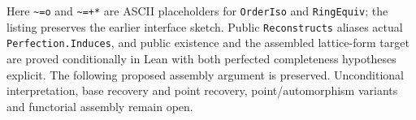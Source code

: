 \documentclass[11pt,oneside]{article}
\theoremstyle{definition}
\theoremstyle{remark}
\newcommand{\lean}[1]{\nolinkurl{#1}}
\begin{document}
Here \lean{~=o} and \lean{~=+*} are ASCII placeholders for \lean{OrderIso} and
\lean{RingEquiv}; the listing preserves the earlier interface sketch. Public
\lean{Reconstructs} aliases actual \lean{Perfection.Induces}, and public existence
and the assembled lattice-form target are proved conditionally in Lean with
both perfected completeness hypotheses explicit. The following proposed
assembly argument is preserved. Unconditional interpretation, base recovery
and point recovery, point/automorphism variants and functorial assembly remain open.
\end{document}
